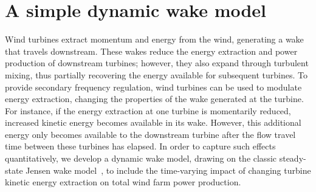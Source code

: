 \chapter{A simple dynamic wake model}
\label{chap:dynwake}

Wind turbines extract momentum and energy from the wind, generating a wake that travels downstream. These wakes reduce the energy extraction and power production of downstream turbines; however, they also expand through turbulent mixing, thus partially recovering the energy available for subsequent turbines. To provide secondary frequency regulation, wind turbines can be used to modulate energy extraction, changing the properties of the wake generated at the turbine. For instance, if the energy extraction at one turbine is momentarily reduced, increased kinetic energy becomes available in its wake. However, this additional energy only becomes available to the downstream turbine after the flow travel time between these turbines has elapsed. In order to capture such effects quantitatively, we develop a dynamic wake model, drawing on the classic steady-state Jensen wake model~\cite{Katic1986a}, to include the time-varying impact of changing turbine kinetic energy extraction on total wind farm power production.

